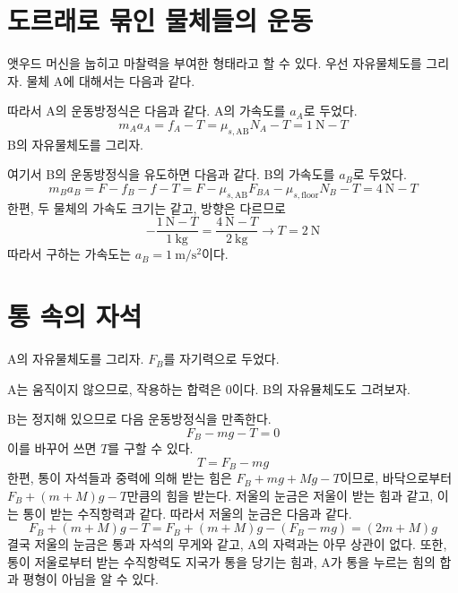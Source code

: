 \documentclass{scrartcl}
\newcommand{\un}[1]{\ensuremath{\ \mathrm{#1}}}
\begin{document}
\section{도르래로 묶인 물체들의 운동}
앳우드 머신을 눕히고 마찰력을 부여한 형태라고 할 수 있다. 우선 자유물체도를 그리자. 물체 A에 대해서는 다음과 같다.
\begin{figure}[H]
\centering
\def\svgwidth{0.35\columnwidth}

\end{figure}
따라서 A의 운동방정식은 다음과 같다. A의 가속도를 \(a_A\)로 두었다.
\[m_A a_A=f_A-T=\mu_{s,\text{AB}} N_A-T=1\un{N}-T\]
B의 자유물체도를 그리자.
\begin{figure}[H]
\centering
\def\svgwidth{0.7\columnwidth}

\end{figure}
여기서 B의 운동방정식을 유도하면 다음과 같다. B의 가속도를 \(a_B\)로 두었다.
\[m_B a_B=F-f_B-f-T=F-\mu_{s,\text{AB}} F_{BA}-\mu_{s,\text{floor}}N_B-T=4\un{N}-T\]
한편, 두 물체의 가속도 크기는 같고, 방향은 다르므로
\[-\frac{1\un{N}-T}{1\un{kg}}=\frac{4\un{N}-T}{2\un{kg}}\longrightarrow T=2\un{N}\]
따라서 구하는 가속도는 \(a_B=1\un{m/s^2}\)이다.

\section{통 속의 자석}
A의 자유물체도를 그리자. \(F_B\)를 자기력으로 두었다.
\begin{figure}[H]
\centering
\def\svgwidth{0.4\columnwidth}

\end{figure}
A는 움직이지 않으므로, 작용하는 합력은 0이다. B의 자유뮬체도도 그려보자.
\begin{figure}[H]
\centering
\def\svgwidth{0.4\columnwidth}

\end{figure}
B는 정지해 있으므로 다음 운동방정식을 만족한다.
\[F_B-mg-T=0\]
이를 바꾸어 쓰면 \(T\)를 구할 수 있다.
\[T=F_B-mg\]
한편, 통이 자석들과 중력에 의해 받는 힘은 \(F_B+mg+Mg-T\)이므로, 바닥으로부터 \(F_B+(m+M)g-T\)만큼의 힘을 받는다. 저울의 눈금은 저울이 받는 힘과 같고, 이는 통이 받는 수직항력과 같다. 따라서 저울의 눈금은 다음과 같다.
\[F_B+(m+M)g-T=F_B+(m+M)g-(F_B-mg)=(2m+M)g\]
결국 저울의 눈금은 통과 자석의 무게와 같고, A의 자력과는 아무 상관이 없다. 또한, 통이 저울로부터 받는 수직항력도 지국가 통을 당기는 힘과, A가 통을 누르는 힘의 합과 평형이 아님을 알 수 있다.
\end{document}
